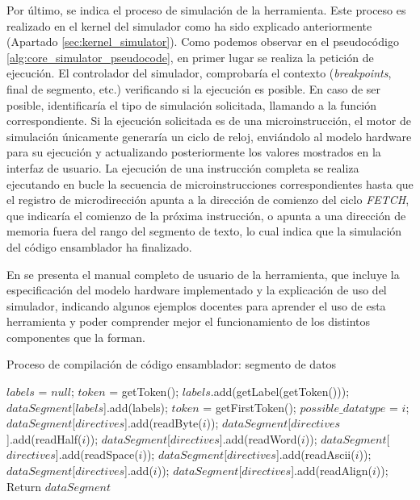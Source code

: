 Por último, se indica el proceso de simulación de la herramienta. Este proceso es realizado en el kernel del simulador como ha sido explicado anteriormente (Apartado \ref{sec:kernel_simulator}). Como podemos observar en el pseudocódigo \ref{alg:core_simulator_pseudocode}, en primer lugar se realiza la petición de ejecución. El controlador del simulador, comprobaría el contexto (\textit{breakpoints}, final de segmento, etc.) verificando si la ejecución es posible. En caso de ser posible, identificaría el tipo de simulación solicitada, llamando a la función correspondiente. Si la ejecución solicitada es de una microinstrucción, el motor de simulación únicamente generaría un ciclo de reloj, enviándolo al modelo hardware para su ejecución y actualizando posteriormente los valores mostrados en la interfaz de usuario. La ejecución de una instrucción completa se realiza ejecutando en bucle la secuencia de microinstrucciones correspondientes hasta que el registro de microdirección apunta a la dirección de comienzo del ciclo \textit{FETCH}, que indicaría el comienzo de la próxima instrucción, o apunta a una dirección de memoria fuera del rango del segmento de texto, lo cual indica que la simulación del código ensamblador ha finalizado.

En \cite{wepsimManualUser} se presenta el manual completo de usuario de la herramienta, que incluye la especificación del modelo hardware implementado y la explicación de uso del simulador, indicando algunos ejemplos docentes para aprender el uso de esta herramienta y poder comprender mejor el funcionamiento de los distintos componentes que la forman.

\begin{algorithm}[h]
	\caption{Proceso de compilación de código ensamblador: segmento de datos}
	\label{alg:data_segment_pseudocode}
  	\scriptsize
	\begin{algorithmic}[1]
			\State $labels$ = $null$;		
			\State $token$ = getToken();
			   
					\State $labels$.add(getLabel(getToken()));
				\EndIf
			\EndWhile
			\State $dataSegment$[$labels$].add(labels);
			\State $token$ = getFirstToken();
				  
				\State $possible\_datatype$ = $i$;
					$dataSegment$[$directives$].add(readByte($i$));
				\EndIf
					$dataSegment$[$directives$].add(readHalf($i$));
				\EndIf
					$dataSegment$[$directives$].add(readWord($i$));
				\EndIf
					$dataSegment$[$directives$].add(readSpace($i$));
				\EndIf
					$dataSegment$[$directives$].add(readAscii($i$));
				\EndIf
					$dataSegment$[$directives$].add($i$));
				\EndIf
					$dataSegment$[$directives$].add(readAlign($i$));
				\EndIf
			\EndFor
			 \State Return $dataSegment$
		\EndFunction
	\end{algorithmic}
\end{algorithm}

